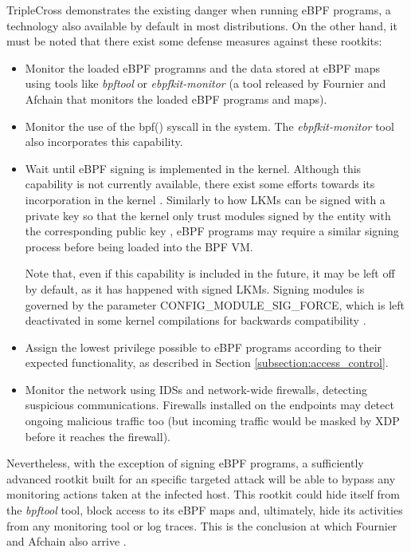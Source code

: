 TripleCross demonstrates the existing danger when running eBPF programs, a
technology also available by default in most distributions. On the other
hand, it must be noted that there exist some defense measures against these
rootkits:
\begin{itemize}
\item Monitor the loaded eBPF programns and the data stored at eBPF maps using tools like \textit{bpftool} or \textit{ebpfkit-monitor} \cite{ebpfkit_monitor_github} (a tool released by Fournier and Afchain that monitors the loaded eBPF programs and maps).
\item Monitor the use of the bpf() syscall in the system. The \textit{ebpfkit-monitor} tool also incorporates this capability.
\item Wait until eBPF signing is implemented in the kernel. Although this capability is not currently available, there exist some efforts towards its incorporation in the kernel \cite{bpf_signing}. Similarly to how LKMs can be signed with a private key so that the kernel only trust modules signed by the entity with the corresponding public key \cite{lkm_signing}, eBPF programs may require a similar signing process before being loaded into the BPF VM.

Note that, even if this capability is included in the future, it may be
left off by default, as it has happened with signed LKMs. Signing modules is governed by the parameter CONFIG\_MODULE\_SIG\_FORCE, which is left deactivated in some kernel compilations for backwards compatibility \cite{arch_linux_sign}.
\item Assign the lowest privilege possible to eBPF programs according to their expected functionality, as described in Section \ref{subsection:access_control}.
\item Monitor the network using IDSs and network-wide firewalls, detecting suspicious communications. Firewalls installed on the endpoints may detect ongoing malicious traffic too (but incoming traffic would be masked by XDP before it reaches the firewall).
\end{itemize}

Nevertheless, with the exception of signing eBPF programs, a sufficiently
advanced rootkit built for an specific targeted attack will be able to
bypass any monitoring actions taken at the infected host. This rootkit
could hide itself from the \textit{bpftool} tool, block access to its eBPF
maps and, ultimately, hide its activities from any monitoring tool or log
traces. This is the conclusion at which Fournier and Afchain also arrive
\cite{ebpf_friends_54}.

